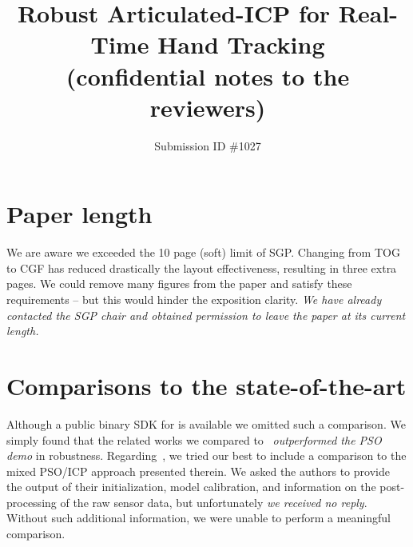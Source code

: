\documentclass{egpubl}
\title{Robust Articulated-ICP for Real-Time Hand Tracking\\(confidential notes to the reviewers)}
\author[Submission ID \#1027]{\Large Submission ID \#1027}
\begin{document}
\maketitle
\vspace{-1in}
\section{Paper length}
We are aware we exceeded the 10 page (soft) limit of SGP. Changing from TOG to CGF has reduced drastically the layout effectiveness, resulting in three extra pages. We could remove many figures from the paper and satisfy these requirements -- but this would hinder the exposition clarity. \textit{We have already contacted the SGP chair and obtained permission to leave the paper at its current length.}

\section{Comparisons to the state-of-the-art}
Although a public binary SDK for \cite{oiko_bmvc11} is available we omitted such a comparison. We simply found that the related works we compared to~\cite{sridhar_iccv13,sridhar_14,melax_13,schroeder_icra14,tompson_tog14} \textit{outperformed the PSO demo} in robustness. Regarding~\cite{qian_cvpr14}, we tried our best to include a comparison to the mixed PSO/ICP approach presented therein. We asked the authors to provide the output of their initialization, model calibration, and information on the post-processing of the raw sensor data, but unfortunately \textit{we received no reply}. Without such additional information, we were unable to perform a meaningful comparison.
\end{document}
